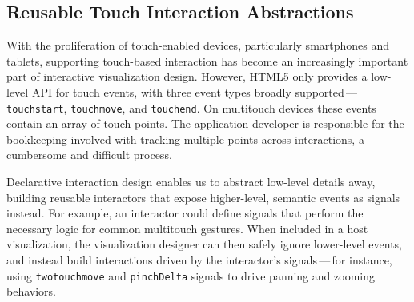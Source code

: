 \subsection{Reusable Touch Interaction Abstractions}

With the proliferation of touch-enabled devices, particularly smartphones and
tablets, supporting touch-based interaction has become an increasingly important
part of interactive visualization design. However, HTML5 only provides a
low-level API for touch events, with three event types broadly
supported\,---\,\texttt{touchstart}, \texttt{touchmove}, and \texttt{touchend}.
On multitouch devices these events contain an array of touch points. The
application developer is responsible for the bookkeeping involved with tracking
multiple points across interactions, a cumbersome and difficult process.

Declarative interaction design enables us to abstract low-level details away,
building reusable interactors that expose higher-level, semantic events as
signals instead. For example, an interactor could define signals that perform
the necessary logic for common multitouch gestures. When included in a host
visualization, the visualization designer can then safely ignore lower-level
events, and instead build interactions driven by the interactor's
signals\,---\,for instance, using \texttt{twotouchmove} and \texttt{pinchDelta}
signals to drive panning and zooming behaviors.